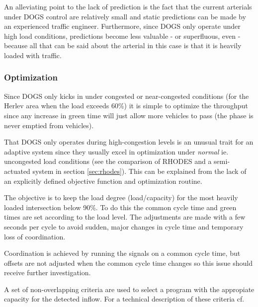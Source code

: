 An alleviating point to the lack of prediction is the fact that the
current arterials under DOGS control are relatively small and static
predictions can be made by an experienced traffic
engineer. Furthermore, since DOGS only operate under high load
conditions, predictions become less valuable - or superfluous, even -
because all that can be said about the arterial in this case is that
it is heavily loaded with traffic.

\subsubsection*{Optimization}

Since DOGS only kicks in under congested or near-congested conditions
(for the Herlev area when the load exceeds 60\%) it is simple to
optimize the throughput since any increase in green time will just
allow more vehicles to pass (the phase is never emptied from
vehicles).

That DOGS only operates during high-congestion levels is an unusual trait for an adaptive system since they usually excel in optimization under \textit{normal} ie. uncongested load conditions (see the comparison of RHODES and a semi-actuated system in section \ref{sec:rhodes}). This can be explained from the lack of an explicitly defined objective function and optimization routine.

The objective is to keep the load degree (load/capacity) for the most heavily loaded intersection below 90\%.
To do this the common cycle time and green times are set according to the load level. The adjustments are made with a few seconds per cycle to avoid sudden, major changes in cycle time and temporary loss of coordination.

Coordination is achieved by running the signals on a common cycle time, but offsets are not adjusted when the common cycle time changes so this issue should receive further investigation.

A set of non-overlapping criteria are used to select a program with the appropiate capacity for the detected inflow. For a technical description of these criteria cf. \cite{forprojekt}



